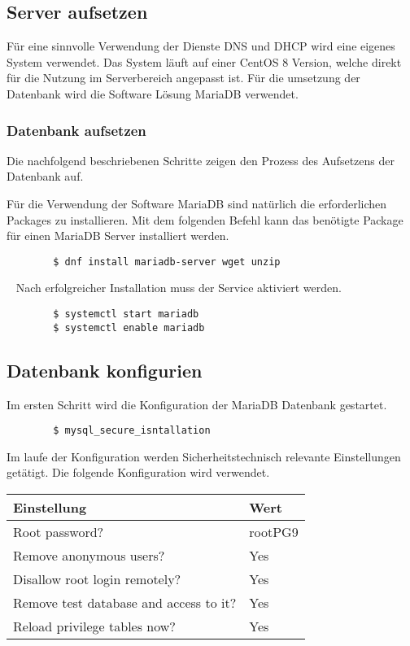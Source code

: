 \documentclass{scrartcl}
\begin{document}
\begin{flushleft}
    \subsection{Server aufsetzen}
    Für eine sinnvolle Verwendung der Dienste DNS und DHCP wird eine eigenes System verwendet. Das System läuft auf einer CentOS 8 Version, welche direkt für die Nutzung im Serverbereich angepasst ist. Für die umsetzung der Datenbank wird die Software Lösung MariaDB verwendet.
    \subsubsection{Datenbank aufsetzen}
    Die nachfolgend beschriebenen Schritte zeigen den Prozess des Aufsetzens der Datenbank auf. \newline
    
    Für die Verwendung der Software MariaDB sind natürlich die erforderlichen Packages zu installieren. 
    Mit dem folgenden Befehl kann das benötigte Package für einen MariaDB Server installiert werden.
    \begin{lstlisting}
        $ dnf install mariadb-server wget unzip    \end{lstlisting} 
    \ \newline
    Nach erfolgreicher Installation muss der Service aktiviert werden.    
    \begin{lstlisting}
        $ systemctl start mariadb
        $ systemctl enable mariadb    \end{lstlisting}
    
    \subsection{Datenbank konfigurien}
    Im ersten Schritt wird die Konfiguration der MariaDB Datenbank gestartet.
    \begin{lstlisting}
        $ mysql_secure_isntallation \end{lstlisting}

    Im laufe der Konfiguration werden Sicherheitstechnisch relevante Einstellungen getätigt. Die folgende Konfiguration wird verwendet.
    \begin{center}
        \begin{tabular}{| l | l |}
            \hline
            \textbf{Einstellung} & \textbf{Wert}\\ \hline
            Root password? & rootPG9 \\ \hline
            Remove anonymous users? & Yes \\ \hline
            Disallow root login remotely? & Yes \\ \hline
            Remove test database and access to it? & Yes \\ \hline
            Reload privilege tables now? & Yes \\ \hline
        \end{tabular}     
    \end{center}    
    

\end{flushleft}
\end{document}
